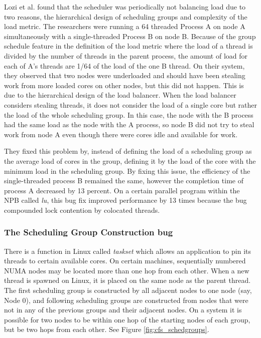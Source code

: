 \documentclass{sig-alternate}
\begin{document}
Lozi et al. found that the scheduler was periodically not balancing load due to two reasons, the hierarchical design of scheduling groups and complexity of the load metric. The researchers were running a 64 threaded Process A on node A simultaneously with a single-threaded Process B on node B. Because of the group schedule feature in the definition of the load metric where the load of a thread is divided by the number of threads in the parent process, the amount of load for each of A's threads are 1/64 of the load of the one B thread. On their system, they observed that two nodes were underloaded and should have been stealing work from more loaded cores on other nodes, but this did not happen. This is due to the hierarchical design of the load balancer. When the load balancer considers stealing threads, it does not consider the load of a single core but rather the load of the whole scheduling group. In this case, the node with the B process had the same load as the node with the A process, so node B did not try to steal work from node A even though there were cores idle and available for work.~\cite{Lozi:2016}

They fixed this problem by, instead of defining the load of a scheduling group as the average load of cores in the group, defining it by the load of the core with the minimum load in the scheduling group. By fixing this issue, the efficiency of the single-threaded process B remained the same, however the completion time of process A decreased by 13 percent. On a certain parallel program within the NPB called \textit{lu}, this bug fix improved performance by 13 times because the bug compounded lock contention by colocated threads.~\cite{Lozi:2016}

\subsubsection{The Scheduling Group Construction bug}
\label{sec:cfsfault_grpconstruct}

There is a function in Linux called \emph{taskset} which allows an application to pin its threads to certain available cores. On certain machines, sequentially numbered NUMA nodes may be located more than one hop from each other. When a new thread is spawned on Linux, it is placed on the same node as the parent thread. The first scheduling group is constructed by all adjacent nodes to one node (say, Node 0), and following scheduling groups are constructed from nodes that were not in any of the previous groups and their adjacent nodes. On a system it is possible for two nodes to be within one hop of the starting nodes of each group, but be two hops from each other. See Figure \ref{fig:cfs_schedgroups}.~\cite{Lozi:2016}
\end{document}
